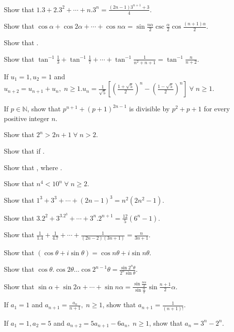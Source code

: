 \item Show that $1.3 + 2.3^2 + \cdots + n.3^n = \frac{(2n - 1)3^{n + 1} + 3}{4}$.
\item Show that $\cos\alpha + \cos2\alpha + \cdots + \cos n\alpha =
  \sin\frac{n\alpha}{2}\csc\frac{\alpha}{2}\cos\frac{(n + 1)\alpha}{2}$.
\item Show that .
\item Show that $\tan^{-1}\frac{1}{3} + \tan^{-1}\frac{1}{7} + \cdots + \tan^{-1}\frac{1}{n^2 + n + 1} = \tan^{-1}\frac{n}{n + 2}$.
\item If $u_1 = 1, u_2 = 1$ and $u_{n + 2} = u_{n + 1} + u_n,\;n\geq 1. u_n = \frac{1}{\sqrt{5}}\left[\left(\frac{1 +
    \sqrt{5}}{2}\right)^n - \left(\frac{1 - \sqrt{5}}{2}\right)^n\right]\;\forall\;n\geq 1$.
\item If $p\in\mathbb{N}$, show that $p^{n + 1} + (p + 1)^{2n - 1}$ is divisible by $p^2 + p + 1$ for every positive integer $n$.
\item Show that $2^n > 2n + 1\;\forall\;n > 2$.
\item Show that  if .
\item Show that , where .
\item Show that $n^4 < 10^n\;\forall\;n\geq 2$.
\item Show that $1^3 + 3^3 + \cdots + (2n - 1)^3 = n^2(2n^2 - 1)$.
\item Show that $3.2^2 + 3^3.2^3 + \cdots + 3^n.2^{n + 1} = \frac{12}{5}(6^n - 1)$.
\item Show that $\frac{1}{1.4} + \frac{1}{4.7} + \cdots + \frac{1}{(2n - 2)(3n + 1)} = \frac{n}{3n+ 1}$.
\item Show that $(\cos\theta + i\sin\theta) = \cos n\theta + i\sin n\theta$.
\item Show that $\cos\theta.\cos2\theta\ldots\cos2^{n - 1}\theta = \frac{\sin2^n\theta}{2^n\sin\theta}$.
\item Show that $\sin\alpha + \sin2\alpha + \cdots + \sin n\alpha = \frac{\sin \frac{n\alpha}{2}}{\sin\frac{\alpha}{2}}\sin\frac{n +
  1}{2}\alpha$.
\item If $a_1 = 1$ and $a_{n + 1} = \frac{a_n}{n + 1},\;n\geq 1$, show that $a_{n + 1} = \frac{1}{(n + 1)!}$.
\item If $a_1 = 1, a_2 = 5$ and $a_{n + 2} = 5a_{n + 1} - 6a_n,\;n\geq 1$, show that $a_n = 3^n - 2^n$.
